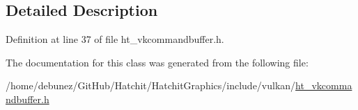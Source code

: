 \subsection{Detailed Description}


Definition at line 37 of file ht\+\_\+vkcommandbuffer.\+h.



The documentation for this class was generated from the following file\+:\begin{DoxyCompactItemize}
\item 
/home/debunez/\+Git\+Hub/\+Hatchit/\+Hatchit\+Graphics/include/vulkan/\hyperlink{ht__vkcommandbuffer_8h}{ht\+\_\+vkcommandbuffer.\+h}\end{DoxyCompactItemize}
